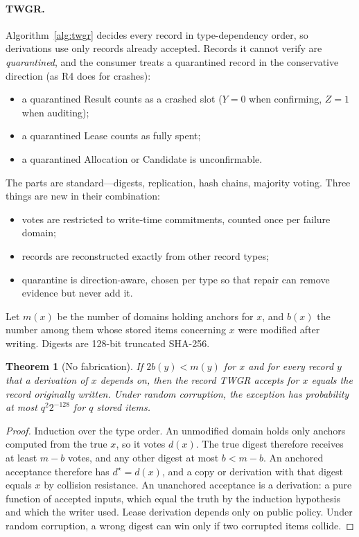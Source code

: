 \documentclass[pdflatex,sn-mathphys-num]{sn-jnl}
\theoremstyle{thmstyleone}
\newtheorem{theorem}{Theorem}
\theoremstyle{thmstyletwo}
\theoremstyle{thmstylethree}
\begin{document}
\paragraph{TWGR.} Algorithm~\ref{alg:twgr} decides every record in type-dependency order, so derivations use only records already accepted. Records it cannot verify are \emph{quarantined}, and the consumer treats a quarantined record in the conservative direction (as R4 does for crashes):
\begin{itemize}
\item a quarantined Result counts as a crashed slot ($Y=0$ when confirming, $Z=1$ when auditing);
\item a quarantined Lease counts as fully spent;
\item a quarantined Allocation or Candidate is unconfirmable.
\end{itemize}
The parts are standard---digests, replication, hash chains, majority voting. Three things are new in their combination:
\begin{itemize}
\item votes are restricted to write-time commitments, counted once per failure domain;
\item records are reconstructed exactly from other record types;
\item quarantine is direction-aware, chosen per type so that repair can remove evidence but never add it.
\end{itemize}

Let $m(x)$ be the number of domains holding anchors for $x$, and $b(x)$ the number among them whose stored items concerning $x$ were modified after writing. Digests are 128-bit truncated SHA-256.

\begin{theorem}[No fabrication]\label{thm:nofab}
If $2b(y)<m(y)$ for $x$ and for every record $y$ that a derivation of $x$ depends on, then the record TWGR accepts for $x$ equals the record originally written. Under random corruption, the exception has probability at most $q^2 2^{-128}$ for $q$ stored items.
\end{theorem}
\begin{proof}
Induction over the type order. An unmodified domain holds only anchors computed from the true $x$, so it votes $d(x)$. The true digest therefore receives at least $m-b$ votes, and any other digest at most $b<m-b$. An anchored acceptance therefore has $d^\star=d(x)$, and a copy or derivation with that digest equals $x$ by collision resistance. An unanchored acceptance is a derivation: a pure function of accepted inputs, which equal the truth by the induction hypothesis and which the writer used. Lease derivation depends only on public policy. Under random corruption, a wrong digest can win only if two corrupted items collide.
\end{proof}
\end{document}
